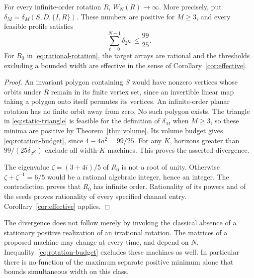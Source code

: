 \begin{theorem}
\label{thm:rotation-unbounded}
For every infinite-order rotation $R$, $W_N(R)\to\infty$. More precisely,
put $\delta_M=\delta_M(S,D,\{I,R\})$. These numbers are positive for
$M\ge3$, and every feasible profile satisfies
\begin{equation}\label{eq:rotation-budget}
                    \sum_{t=0}^{N-1}\delta_{2^{K_t}}\le\frac{99}{25}.
\end{equation}
For $R_0$ in \eqref{eq:rational-rotation}, the target arrays are rational
and the thresholds excluding a bounded width are effective in the sense
of Corollary~\ref{cor:effective}.
\end{theorem}
\begin{proof}
An invariant polygon containing $S$ would have nonzero vertices whose
orbits under $R$ remain in its finite vertex set, since an invertible
linear map taking a polygon onto itself permutes its vertices. An
infinite-order planar rotation has no finite orbit away from zero.
No such polygon exists. The triangle in \eqref{eq:static-triangle} is
feasible for the definition of $\delta_M$ when $M\ge3$, so these minima
are positive by Theorem~\ref{thm:volume}. Its volume budget gives
\eqref{eq:rotation-budget}, since $4-4a^2=99/25$.
For any $K$, horizons greater than $99/(25\delta_{2^K})$ exclude all
width-$K$ machines. This proves the asserted divergence.

The eigenvalue $\zeta=(3+4i)/5$ of $R_0$ is not a root of unity. Otherwise
$\zeta+\zeta^{-1}=6/5$ would be a rational algebraic integer, hence an
integer. The contradiction proves that $R_0$ has infinite order.
Rationality of its powers and of the seeds proves rationality of every
specified channel entry. Corollary~\ref{cor:effective} applies.
\end{proof}

The divergence does not follow merely by invoking the classical absence
of a stationary positive realization of an irrational rotation. The
matrices of a proposed machine may change at every time, and depend on
$N$. Inequality~\eqref{eq:rotation-budget} excludes these machines as
well. In particular there is no function of the maximum separate
positive minimum alone that bounds simultaneous width on this class.

